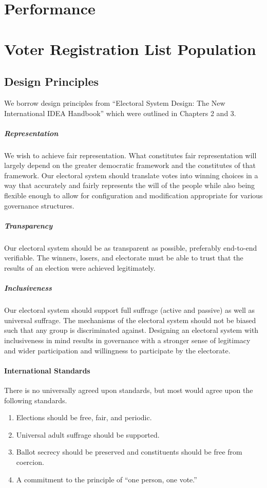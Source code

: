 \section{Performance}


\section{Voter Registration List Population}



\subsection{Design Principles}
We borrow design principles from ``Electoral System Design: The New
International IDEA Handbook'' which were outlined in Chapters 2 and 3.

\subparagraph{Representation} We wish to achieve fair representation. What
constitutes fair representation will largely depend on the greater democratic
framework and the constitutes of that framework. Our electoral system should
translate votes into winning choices in a way that accurately and fairly
represents the will of the people while also being flexible enough to allow for
configuration and modification appropriate for various governance structures.

\subparagraph{Transparency} Our electoral system should be as transparent as
possible, preferably end-to-end verifiable. The winners, losers, and electorate
must be able to trust that the results of an election were achieved
legitimately.

\subparagraph{Inclusiveness} Our electoral system should support full suffrage
(active and passive) as well as universal suffrage. The mechanisms of the
electoral system should not be biased such that any group is discriminated
against. Designing an electoral system with inclusiveness in mind results in
governance with a stronger sense of legitimacy and wider participation and
willingness to participate by the electorate.

\paragraph{International Standards} There is no universally agreed upon
standards, but most would agree upon the following standards.

\begin{enumerate}[label=\Large$\square$]
  \item Elections should be free, fair, and periodic.
  \item Universal adult suffrage should be supported.
  \item Ballot secrecy should be preserved and constituents should be free
    from coercion.
  \item A commitment to the principle of ``one person, one vote.''
\end{enumerate}

